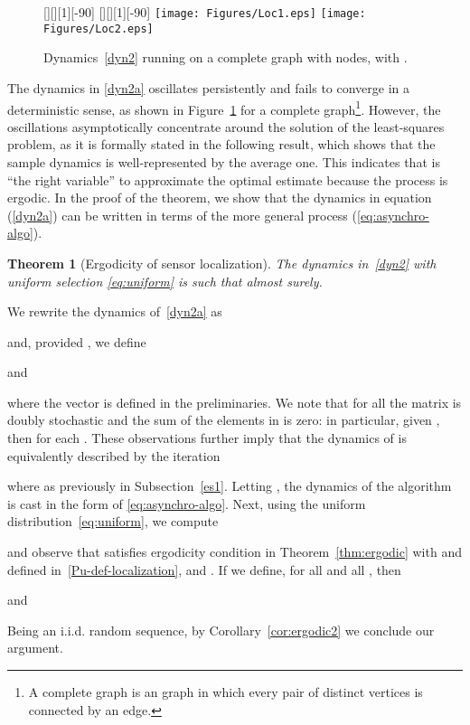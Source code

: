 \documentclass{IEEEtran}
\newtheorem{theorem}{Theorem}
\newcommand{\1}{\mathbf{1}} \newcommand{\ind}{\mathds{1}}
\begin{document}
\begin{figure}[h]
\begin{center}
[][][1][-90]{}
[][][1][-90]{}
\texttt{[image: Figures/Loc1.eps]}
\texttt{[image: Figures/Loc2.eps]}
\caption{Dynamics~\eqref{dyn2} running on a complete graph with  nodes, with .}
\label{fig:simul-complete}
\end{center}
\end{figure}

The dynamics in \eqref{dyn2a} oscillates persistently and fails to converge in a deterministic sense, as shown in Figure~\ref{fig:simul-complete} for a complete graph\footnote{A 
complete graph is
an graph in which every pair of distinct vertices is connected by an edge.}.
However, the oscillations asymptotically concentrate around the solution of the least-squares problem, as it is formally stated in the following result, which shows that the sample dynamics is well-represented by the average one. This 
indicates that  is ``the right variable'' to approximate the optimal estimate  because the process  is ergodic. In the proof of the theorem, we show that the dynamics in equation (\ref{dyn2a})
can be written in terms of the more general process (\ref{eq:asynchro-algo}). 

\begin{theorem}[Ergodicity of sensor localization]
\label{theorem:convforlocal}
The dynamics in~\eqref{dyn2} with uniform selection \eqref{eq:uniform} is such that 
almost surely. 
\end{theorem}
\begin{IEEEproof}
We rewrite the dynamics of~\eqref{dyn2a} as

and, provided , we define
 
and
 
where the vector  is defined in the preliminaries.
We note that  for all  the matrix  is doubly stochastic and the sum of the elements in  is zero:
in particular, given , then  for each .
These observations further imply that the dynamics of  is equivalently described by the iteration

where  as previously in Subsection~\ref{es1}.
Letting , the dynamics of the algorithm is cast in the form of \eqref{eq:asynchro-algo}.
Next, using the uniform distribution~\eqref{eq:uniform}, we compute

and observe that  satisfies ergodicity condition in Theorem~\ref{thm:ergodic} with  and  defined in~\eqref{Pu-def-localization},  and . 
If we define, for all  and all , 
then

and

Being  an i.i.d. random sequence, by Corollary~\ref{cor:ergodic2} we conclude our argument.
\end{IEEEproof}
\end{document}
